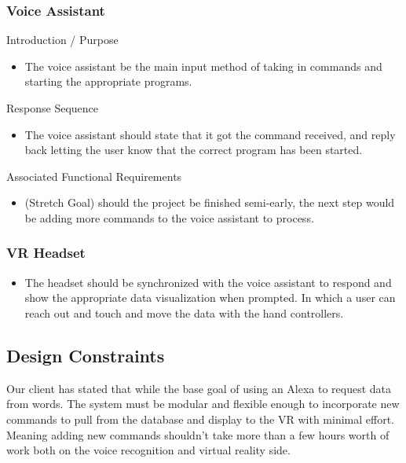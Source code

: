 \documentclass[onecolumn, draftclsnofoot,10pt, compsoc]{IEEEtran}
\begin{document}
        \subsubsection{Voice Assistant}
            Introduction / Purpose
            \begin{itemize}
                \item The voice assistant be the main input method of taking in commands and starting the appropriate programs.
            \end{itemize}
            Response Sequence
            \begin{itemize}
                \item The voice assistant should state that it got the command received, and reply back letting the user know that the correct program has been started.
            \end{itemize}
            Associated Functional Requirements
            \begin{itemize}
                \item (Stretch Goal) should the project be finished semi-early, the next step would be adding more commands to the voice assistant to process.

            \end{itemize}
        \subsubsection{VR Headset}
            \begin{itemize}
                    \item The headset should be synchronized with the voice assistant to respond and show the appropriate data visualization when prompted. In which a user can reach out and touch and move the data with the hand controllers.
            \end{itemize}

    \subsection{Design Constraints}
        Our client has stated that while the base goal of using an Alexa to request data from words. The system must be modular and flexible enough to incorporate new commands to pull from the database and display to the VR with minimal effort. Meaning adding new commands shouldn’t take more than a few hours worth of work both on the voice recognition and virtual reality side.
\end{document}

